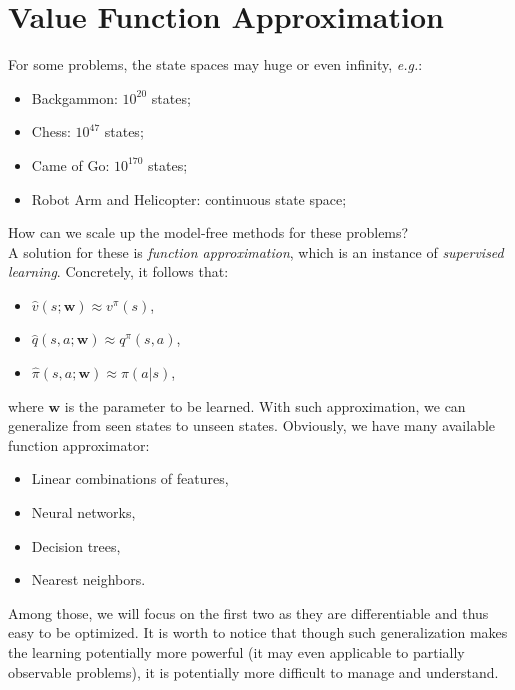 \documentclass{progartcn}
\begin{document}
\begin{comment}
			By the update rule, we know the $\mu$ can not be zero when $\pi$ is non-zero. It should be noticed that importance sampling can dramatically increase the variance.

			\textbf{Importance Sampling for Off-Policy TD}: \textit{Weight TD target $R+\gamma V(S')$ by importance sampling, then we only need a single importance sampling correction to update the value}
			\[V(S_t)\gets V(S_t)+\alpha\left(\frac{\pi(A_t|S_t)}{\mu(A_t|S_t)}(R_{t+1}+\gamma V(S_{t+1}))-V(S_t)\right).\]
\end{comment}

\pagebreak

\section{Value Function Approximation}
	\label{sec: value function approximation}

	For some problems, the state spaces may huge or even infinity, \textit{e.g.}:
		\begin{itemize}[noitemsep,topsep=0pt]
			\item Backgammon: $10^{20}$ states;
			\item Chess: $10^{47}$ states;
			\item Came of Go: $10^{170}$ states;
			\item Robot Arm and Helicopter: continuous state space;
		\end{itemize}
	
	How can we scale up the model-free methods for these problems?\\

	A solution for these is \textit{function approximation}, which is an instance of \textit{supervised learning}. Concretely, it follows that:
		\begin{itemize}[noitemsep,topsep=0pt]
			\item $\hat v(s;\bm{w})\approx v^\pi(s)$,
			\item $\hat q(s,a;\bm{w})\approx q^\pi(s,a)$,
			\item $\hat \pi(s,a;\bm{w})\approx \pi(a|s)$,
		\end{itemize}
	where $\bm{w}$ is the parameter to be learned. With such approximation, we can generalize from seen states to unseen states. Obviously, we have many available function approximator:
		\begin{itemize}[noitemsep,topsep=0pt]
			\item Linear combinations of features,
			\item Neural networks,
			\item Decision trees,
			\item Nearest neighbors.
		\end{itemize}
	Among those, we will focus on the first two as they are differentiable and thus easy to be optimized. It is worth to notice that though such generalization makes the learning potentially more powerful (it may even applicable to partially observable problems), it is potentially more difficult to manage and understand.\\
\end{document}
